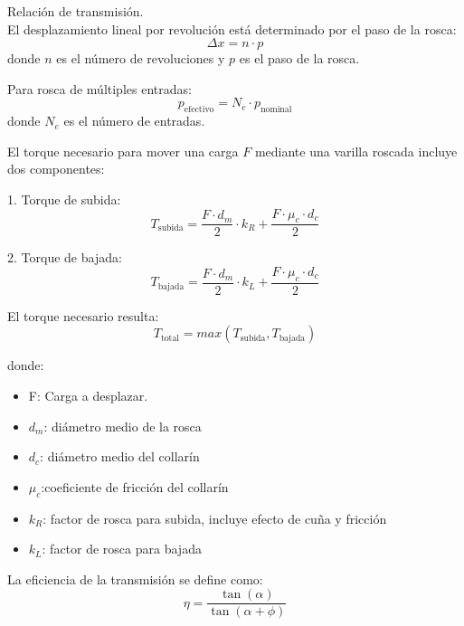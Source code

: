 Relación de transmisión.\\
\noindent
El desplazamiento lineal por revolución está determinado por el paso de la rosca:
\begin{equation}
    \Delta x = n \cdot p
\end{equation}
donde $n$ es el número de revoluciones y $p$ es el paso de la rosca.

Para rosca de múltiples entradas:
\begin{equation}
    p_{\text{efectivo}} = N_e \cdot p_{\text{nominal}}
\end{equation}
donde $N_e$ es el número de entradas.

El torque necesario para mover una carga $F$ mediante una varilla roscada incluye dos componentes:

1. Torque de subida:
\begin{equation}
T_{\text{subida}} = \frac{F \cdot d_m}{2} \cdot k_R + \frac{F \cdot \mu_c \cdot d_c}{2}
\label{eq:torque_subida}
\end{equation}

2. Torque de bajada:
\begin{equation}
T_{\text{bajada}} = \frac{F \cdot d_m}{2} \cdot k_L + \frac{F \cdot \mu_c \cdot d_c}{2}
\label{eq:torque_bajada}
\end{equation}

El torque necesario resulta:
\begin{equation}
    T_{\text{total}} = max(T_{\text{subida}}, T_{\text{bajada}})
    \label{eq:torque_total_varilla}
\end{equation}

donde:
\begin{itemize}[label=$\bullet$]
    \item F: Carga a desplazar.
    \item $d_m$: diámetro medio de la rosca
    \item $d_c$: diámetro medio del collarín
    \item $\mu_c$:coeficiente de fricción del collarín
    \item $k_R$:  factor de rosca para subida, incluye efecto de cuña y fricción
    \item $k_L$: factor de rosca para bajada
\end{itemize}

La eficiencia de la transmisión se define como:
\begin{equation}
    \eta = \frac{\tan(\alpha)}{\tan(\alpha + \phi)}
\end{equation}

